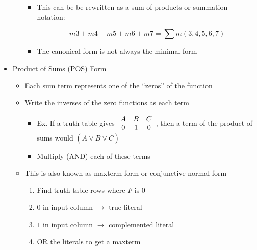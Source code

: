 \begin{itemize}
\begin{itemize}
\begin{itemize}
          \item This can be be rewritten as a sum of products or summation notation:

            $$m3 + m4 + m5 + m6 + m7=\sum m(3,4,5,6,7)$$

          \item The canonical form is not always the minimal form

        \end{itemize}

    \end{itemize}

  \item Product of Sums (POS) Form

    \begin{itemize}

      \item Each sum term represents one of the ``zeros'' of the function

      \item Write the inverses of the zero functions as each term

        \begin{itemize}

          \item Ex. If a truth table gives $\begin{array}{c c c} A & B & C\\ 0 & 1 & 0 \end{array}$, then a term of the product of sums would $(A\vee \bar{B}\vee C)$

          \item Multiply (AND) each of these terms

        \end{itemize}

      \item This is also known as maxterm form or conjunctive normal form

        \begin{enumerate}

          \item Find truth table rows where $F$ is 0

          \item $0$ in input column $\rightarrow$ true literal

          \item $1$ in input column $\rightarrow$ complemented literal

          \item OR the literals to get a maxterm


\end{enumerate}
\end{itemize}
\end{itemize}
